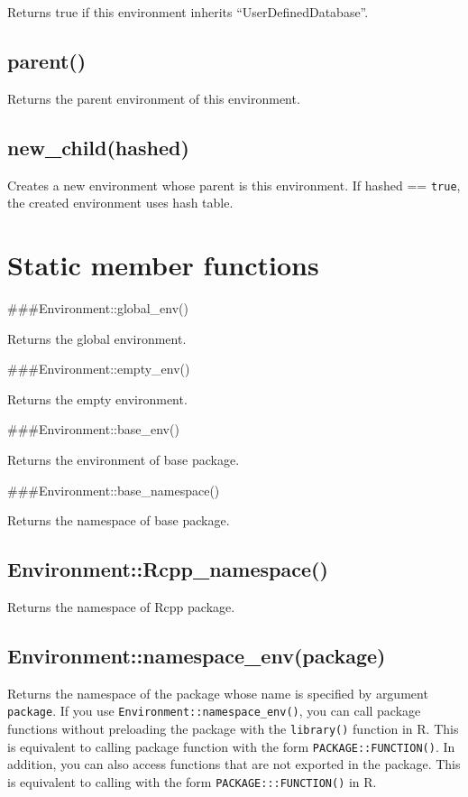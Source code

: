 \documentclass[]{book}
\begin{document}
Returns true if this environment inherits ``UserDefinedDatabase''.

\hypertarget{parent}{%
\subsection{parent()}\label{parent}}

Returns the parent environment of this environment.

\hypertarget{new_childhashed}{%
\subsection{new\_child(hashed)}\label{new_childhashed}}

Creates a new environment whose parent is this environment. If hashed == \texttt{true}, the created environment uses hash table.

\hypertarget{static-member-functions-2}{%
\section{Static member functions}\label{static-member-functions-2}}

\#\#\#Environment::global\_env()

Returns the global environment.

\#\#\#Environment::empty\_env()

Returns the empty environment.

\#\#\#Environment::base\_env()

Returns the environment of base package.

\#\#\#Environment::base\_namespace()

Returns the namespace of base package.

\hypertarget{environmentrcpp_namespace}{%
\subsection{Environment::Rcpp\_namespace()}\label{environmentrcpp_namespace}}

Returns the namespace of Rcpp package.

\hypertarget{environmentnamespace_envpackage}{%
\subsection{Environment::namespace\_env(package)}\label{environmentnamespace_envpackage}}

Returns the namespace of the package whose name is specified by argument \texttt{package}. If you use \texttt{Environment::namespace\_env()}, you can call package functions without preloading the package with the \texttt{library()} function in R. This is equivalent to calling package function with the form \texttt{PACKAGE::FUNCTION()}. In addition, you can also access functions that are not exported in the package. This is equivalent to calling with the form \texttt{PACKAGE:::FUNCTION()} in R.
\end{document}

